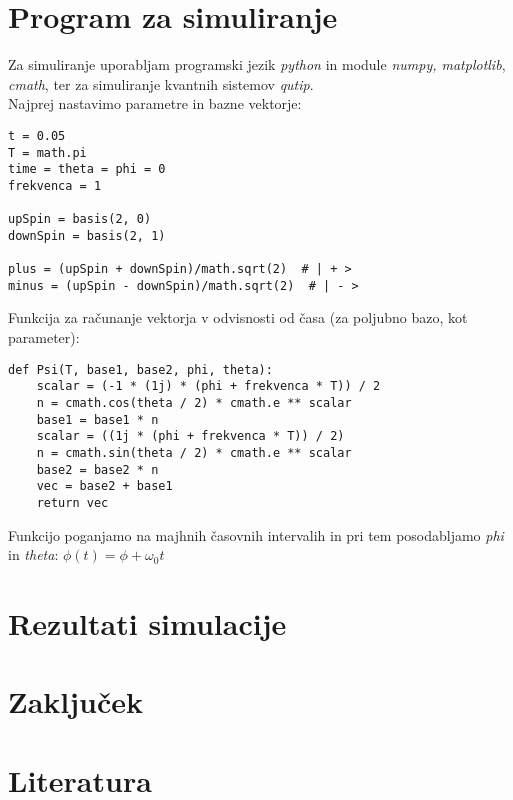 \documentclass[12pt, a4paper]{article}
\begin{document}
\section{Program za simuliranje}
Za simuliranje uporabljam programski jezik \textit{python} in module \textit{numpy, matplotlib}, \textit{cmath}, ter za simuliranje kvantnih sistemov \textit{qutip}.\\
Najprej nastavimo parametre in bazne vektorje:
\lstset{language=Python} 
\begin{lstlisting}
t = 0.05
T = math.pi
time = theta = phi = 0
frekvenca = 1 

upSpin = basis(2, 0)
downSpin = basis(2, 1)

plus = (upSpin + downSpin)/math.sqrt(2)  # | + >
minus = (upSpin - downSpin)/math.sqrt(2)  # | - >
\end{lstlisting}
Funkcija za računanje vektorja v odvisnosti od časa (za poljubno bazo, kot parameter):
\begin{lstlisting}
def Psi(T, base1, base2, phi, theta):
    scalar = (-1 * (1j) * (phi + frekvenca * T)) / 2
    n = cmath.cos(theta / 2) * cmath.e ** scalar
    base1 = base1 * n
    scalar = ((1j * (phi + frekvenca * T)) / 2)
    n = cmath.sin(theta / 2) * cmath.e ** scalar
    base2 = base2 * n
    vec = base2 + base1
    return vec
\end{lstlisting}
Funkcijo poganjamo na majhnih časovnih intervalih in pri tem posodabljamo \textit{phi} in \textit{theta}: $\phi(t) = \phi + \omega_0t$
\section{Rezultati simulacije}

\section{Zaključek}

\section{Literatura}
\end{document}
